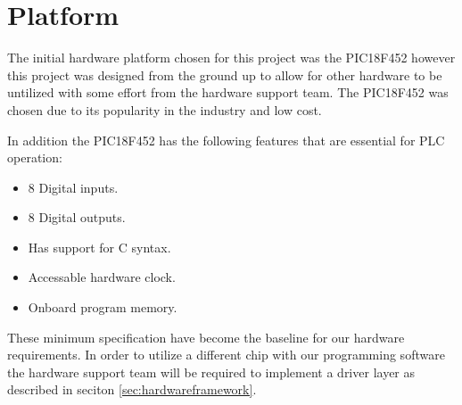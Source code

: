 \section{Platform}
\label{sec:hardwareplatform}

The initial hardware platform chosen for this project was the PIC18F452 however this project was designed from the ground up to allow for other hardware to be untilized with some effort from the hardware support team. The PIC18F452 was chosen due to its popularity in the industry and low cost.

In addition the PIC18F452 has the following features that are essential for PLC operation:

\begin{itemize}
\item 8 Digital inputs.
\item 8 Digital outputs.
\item Has support for C syntax.
\item Accessable hardware clock.
\item Onboard program memory.
\end{itemize}

These minimum specification have become the baseline for our hardware requirements. In order to utilize a different chip with our programming software the hardware support team will be required to implement a driver layer as described in seciton \ref{sec:hardwareframework}.